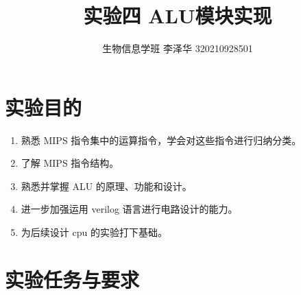 \documentclass[AutoFakeBold]{LZUThesis}
\begin{document}
\title{{实验四 ALU模块实现}}


\author{生物信息学班 李泽华 320210928501}


\frontmatter




\mainmatter

\chapter{实验目的}
\begin{enumerate}
    \item 熟悉 MIPS 指令集中的运算指令，学会对这些指令进行归纳分类。
    \item 了解 MIPS 指令结构。
    \item 熟悉并掌握 ALU 的原理、功能和设计。
    \item 进一步加强运用 verilog 语言进行电路设计的能力。
    \item 为后续设计 cpu 的实验打下基础。
\end{enumerate}

\chapter{实验任务与要求}
\end{document}
